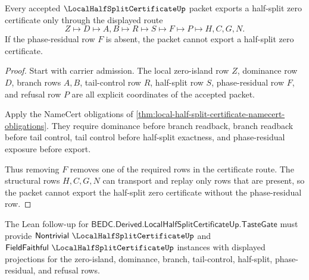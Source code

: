 \begin{theorem}
\label{thm:local-half-split-public-certificate}
Every accepted $\LocalHalfSplitCertificateUp$ packet exports a half-split zero certificate only through the displayed route
$$
Z \longmapsto D \longmapsto A,B \longmapsto R \longmapsto S \longmapsto F \longmapsto P \longmapsto H,C,G,N .
$$
If the phase-residual row $F$ is absent, the packet cannot export a half-split zero certificate.
\end{theorem}
\begin{proof}
Start with carrier admission. The local zero-island row $Z$, dominance row $D$, branch rows $A,B$, tail-control row $R$, half-split row $S$, phase-residual row $F$, and refusal row $P$ are all explicit coordinates of the accepted packet.

Apply the NameCert obligations of \autoref{thm:local-half-split-certificate-namecert-obligations}. They require dominance before branch readback, branch readback before tail control, tail control before half-split exactness, and phase-residual exposure before export.

Thus removing $F$ removes one of the required rows in the certificate route. The structural rows $H,C,G,N$ can transport and replay only rows that are present, so the packet cannot export the half-split zero certificate without the phase-residual row.
\end{proof}



The Lean follow-up for $\mathsf{BEDC.Derived.LocalHalfSplitCertificateUp.TasteGate}$ must provide $\mathsf{Nontrivial}\ \LocalHalfSplitCertificateUp$ and $\mathsf{FieldFaithful}\ \LocalHalfSplitCertificateUp$ instances with displayed projections for the zero-island, dominance, branch, tail-control, half-split, phase-residual, and refusal rows.

